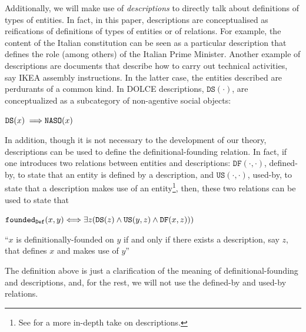 \documentclass[sw]{iosart2x}
\newcommand{\bflist}{\begin{list}{}{\setlength{\topsep}{2mm}\setlength{\partopsep}{0mm}\setlength{\parsep}{0mm}\setlength{\leftmargin}{9mm}\setlength{\labelwidth}{8mm}}}
\newcommand{\eflist}{\end{list}}
\newcommand{\DefLabel}{\textrm{d}}
\newcounter{cntdef}
\newcommand{\mydf}[1]{\refstepcounter{cntdef}\begin{small}{\bf \DefLabel\thecntdef\label{def:#1}}\end{small}}
\newcommand{\mytext}[1]{``#1''}
\newcommand{\generalStyle}[1]{\texttt{#1}}
\newcommand{\biRel}[3]{\generalStyle{#1}(#2,#3)}
\newcommand{\uniRel}[2]{\generalStyle{#1}(#2)}
\newcommand{\biRelPar}[4]{\generalStyle{#1}_{\generalStyle{#4}}(#2,#3)}
\newcommand{\myiff}{\Longleftrightarrow}
\newcommand{\myfi}{\hspace{0.9mm} \Longrightarrow}
\newcommand{\DOLCE}{\textsc{DOLCE}\xspace} %
\newcommand{\DOLCEDescription}[1]{\uniRel{{DS}}{#1}}
\newcommand{\DOLCENASO}[1]{\uniRel{{NASO}}{#1}}
\newcommand{\DOLCEDefinedBy}[2]{\biRel{{DF}}{#1}{#2}}
\newcommand{\DOLCEUsedBy}[2]{\biRel{{US}}{#1}{#2}}
\newcommand{\foundedDef}[2]{\biRelPar{\foundedTerm{passive}}{#1}{#2}{Def}}
\newcommand{\firstTimeKeyWord}[1]{\textit{#1}}
\newcommand{\foundedTerm}[1]{%
  \ifthenelse{\equal{#1}{passive}}{founded}{%
    \ifthenelse{\equal{#1}{verb}}{found}{%
      \ifthenelse{\equal{#1}{gerund}}{founding}{%
        ERROR!%
      }%
    }%
  }%
}
\begin{document}
Additionally, we will make use of \firstTimeKeyWord{descriptions} to directly talk about definitions of types of entities. In fact, in this paper, descriptions are conceptualised as reifications of definitions of types of entities or of relations. For example, the content of the Italian constitution can be seen as a particular description that defines the role (among others) of the Italian Prime Minister. Another example of descriptions are documents that describe how to carry out technical activities, say IKEA assembly instructions. In the latter case, the entities described are perdurants of a common kind.
In \DOLCE descriptions, $\DOLCEDescription{\cdot}$, are conceptualized as a subcategory of non-agentive social objects:
\bflist
\item[\mydf{descriptionSussum}] $ \DOLCEDescription{x} \myfi \DOLCENASO{x} $ 
\eflist
In addition, though it is not necessary to the development of our theory, descriptions can be used to define the definitional-founding relation.
In fact, if one introduces two relations between entities and descriptions: $\DOLCEDefinedBy{\cdot}{\cdot}$, defined-by, to state that an entity is defined by a description, and $\DOLCEUsedBy{\cdot}{\cdot}$, used-by, to state that a description makes use of an entity\footnote{See \cite{masoloSocialRolesTheir2004} for a more in-depth take on descriptions.}, then, these two relations can be used to state that
\bflist
\item[\mydf{foundingDefinitionally}] $ \foundedDef{x}{y} \myiff \exists z(\DOLCEDescription{z} \land \DOLCEUsedBy{y}{z} \land \DOLCEDefinedBy{x}{z}) ) $ 
\item \mytext{$x$ is definitionally-founded on $y$ if and only if there exists a description, say $z$, that defines $x$ and makes use of $y$}
\eflist
The definition above is just a clarification of the meaning of definitional-founding and descriptions, and, for the rest, we will not use the defined-by and used-by relations. 
\end{document}
